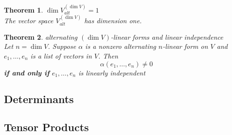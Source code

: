 \documentclass{article}
\newtheorem{theorem}{Theorem}[subsection]
\begin{document}
\begin{CJK}{UTF8}{gkai}
\begin{theorem}
    $\dim V^(\dim V)_{alt}=1$\\

    The vector space $V^(\dim V)_{alt}$ has dimension one.
\end{theorem}

\begin{theorem}
    alternating $(\dim V)$-linear forms and linear independence\\

    Let $n = \dim V$. Suppose $\alpha$ is a nonzero alternating $n$-linear form on $V$ and
    $e_1, \ldots,e_n$ is a list of vectors in $V$. Then
    \[\alpha(e_1, \ldots,e_n) \neq 0\]
    \textbf{if and only if} $e_1,\ldots,e_n$ is linearly independent
\end{theorem}
\subsection{Determinants}

\subsection{Tensor Products}

\end{CJK}
\end{document}
